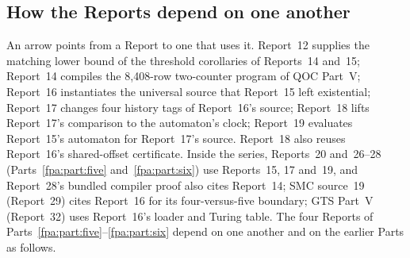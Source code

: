 \documentclass[11pt,a4paper]{article}
\numberwithin{equation}{section}
\begin{document}
\subsection{How the Reports depend on one another}\label{fpa:sec:deps}
\begin{center}
\end{center}
An arrow points from a Report to one that uses it. Report~12 supplies the matching lower bound of the threshold corollaries of Reports~14 and~15; Report~14 compiles the 8,408-row two-counter program of QOC Part~V; Report~16 instantiates the universal source that Report~15 left existential; Report~17 changes four history tags of Report~16's source; Report~18 lifts Report~17's comparison to the automaton's clock; Report~19 evaluates Report~15's automaton for Report~17's source. Report~18 also reuses Report~16's shared-offset certificate. Inside the series, Reports~20 and~26--28 (Parts~\ref{fpa:part:five} and~\ref{fpa:part:six}) use Reports~15, 17 and~19, and Report~28's bundled compiler proof also cites Report~14; SMC source~19 (Report~29) cites Report~16 for its four-versus-five boundary; GTS Part~V (Report~32) uses Report~16's loader and Turing table. The four Reports of Parts~\ref{fpa:part:five}--\ref{fpa:part:six} depend on one another and on the earlier Parts as follows.
\end{document}
